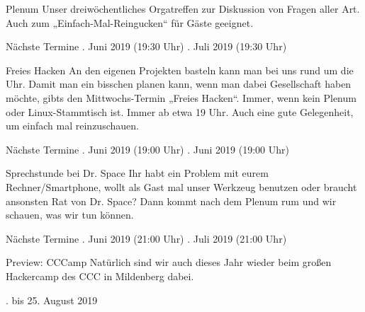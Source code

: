 \documentclass[flyer]{netz39} %
\begin{document}

\begin{entry}{Plenum}
Unser dreiwöchentliches Orgatreffen zur Diskussion von Fragen aller Art. Auch zum „Einfach-Mal-Reingucken“ für Gäste geeignet. 
\begin{events}{Nächste Termine} 
	. Juni 2019 (19:30 Uhr)
	. Juli 2019 (19:30 Uhr)
\end{events}
\end{entry}

\begin{entry}{Freies Hacken}
An den eigenen Projekten basteln kann man bei uns rund um die Uhr. Damit man ein bisschen planen kann, wenn man dabei Gesellschaft haben möchte, gibts den Mittwochs-Termin „Freies Hacken“. Immer, wenn kein Plenum oder Linux-Stammtisch ist. Immer ab etwa 19 Uhr. Auch eine gute Gelegenheit, um einfach mal reinzuschauen.
\begin{events}{Nächste Termine} 
	. Juni 2019 (19:00 Uhr)
	. Juni 2019 (19:00 Uhr)
\end{events}
\end{entry}

\begin{entry}{Sprechstunde bei Dr. Space}
Ihr habt ein Problem mit eurem Rechner/Smartphone, wollt als Gast mal unser Werkzeug benutzen oder braucht ansonsten Rat von Dr. Space? Dann kommt nach dem Plenum rum und wir schauen, was wir tun können. 
\begin{events}{Nächste Termine} 
	. Juni 2019 (21:00 Uhr)
	. Juli 2019 (21:00 Uhr)
\end{events}
\end{entry}

\begin{entry}{Preview: CCCamp}
Natürlich sind wir auch dieses Jahr wieder beim großen Hackercamp des CCC in Mildenberg dabei. 
\begin{events}{} 
	. bis 25. August 2019
\end{events}
\end{entry}
\end{document}
